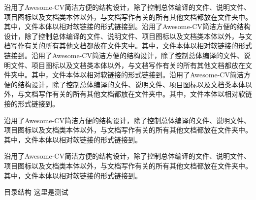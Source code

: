 \begin{cvparagraph}
  沿用了Awesome-CV简洁方便的结构设计，除了控制总体编译的文件、说明文件、项目图标以及文档类本体以外，与文档写作有关的所有其他文档都放在文件夹中。其中，文件本体以相对软链接的形式链接到。沿用了Awesome-CV简洁方便的结构设计，除了控制总体编译的文件、说明文件、项目图标以及文档类本体以外，与文档写作有关的所有其他文档都放在文件夹中。其中，文件本体以相对软链接的形式链接到。沿用了Awesome-CV简洁方便的结构设计，除了控制总体编译的文件、说明文件、项目图标以及文档类本体以外，与文档写作有关的所有其他文档都放在文件夹中。其中，文件本体以相对软链接的形式链接到。沿用了Awesome-CV简洁方便的结构设计，除了控制总体编译的文件、说明文件、项目图标以及文档类本体以外，与文档写作有关的所有其他文档都放在文件夹中。其中，文件本体以相对软链接的形式链接到。
\end{cvparagraph}

\begin{cvparagraph}
  \dk 沿用了Awesome-CV简洁方便的结构设计，除了控制总体编译的文件、说明文件、项目图标以及文档类本体以外，与文档写作有关的所有其他文档都放在文件夹中。其中，文件本体以相对软链接的形式链接到。
\end{cvparagraph}

\dk 沿用了Awesome-CV简洁方便的结构设计，除了控制总体编译的文件、说明文件、项目图标以及文档类本体以外，与文档写作有关的所有其他文档都放在文件夹中。其中，文件本体以相对软链接的形式链接到。

\begin{dkcomment}{目录结构}{\faFolder}
这里是测试
\end{dkcomment}

